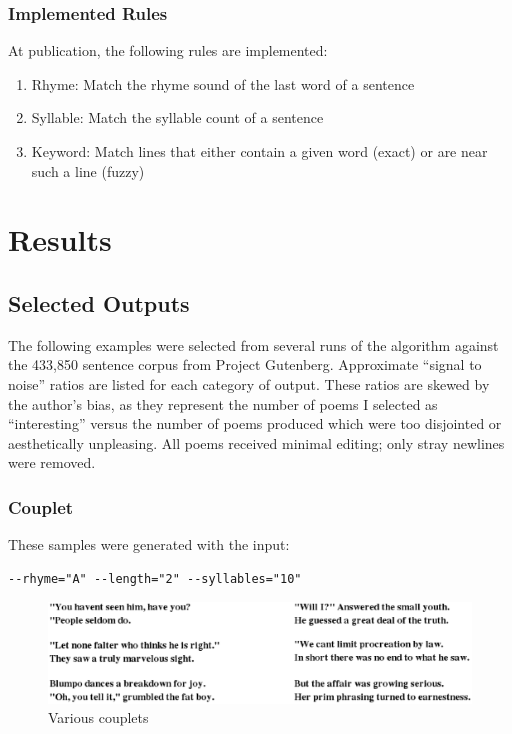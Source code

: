 \documentclass[10pt]{article}
\begin{document}
\subsubsection{Implemented Rules}
At publication, the following rules are implemented:
\singlespacing
\begin{enumerate}
\item Rhyme: Match the rhyme sound of the last word of a sentence
\item Syllable: Match the syllable count of a sentence
\item Keyword: Match lines that either contain a given word (exact) or are near such a line (fuzzy)
\end{enumerate}
\doublespacing

\section{Results}
\subsection{Selected Outputs}
The following examples were selected from several runs of the algorithm against
the 433,850 sentence corpus from Project Gutenberg. Approximate ``signal to
noise'' ratios are listed for each category of output. These ratios are skewed
by the author's bias, as they represent the number of poems I selected as
``interesting'' versus the number of poems produced which were too disjointed or
aesthetically unpleasing. All poems received minimal editing; only stray newlines
were removed.

\subsubsection{Couplet}
These samples were generated with the input:
\begin{verbatim}
--rhyme="A" --length="2" --syllables="10"
\end{verbatim}

\begin{figure}[here]
\begin{center}
    \includegraphics[width=5.5in]{couplets.eps}
\end{center}
\caption{Various couplets}
\end{figure}
\end{document}
